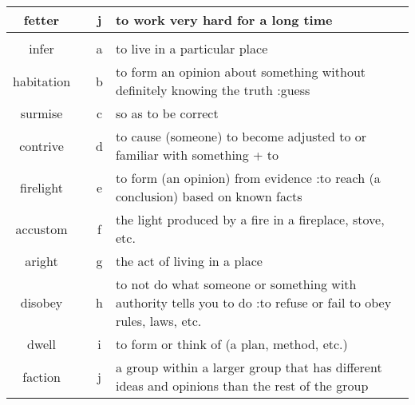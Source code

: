 \documentclass[a4paper]{article}
\begin{document}
\begin{center}
\begin{tabular}{|c|c|c|m{}|}
\hline
fetter & & j &  to work very hard for a long time \\
\hline
 & & & \\
\hline
infer & & a &  to live in a particular place \\
\hline
habitation & & b &  to form an opinion about something without definitely knowing the truth :guess \\
\hline
surmise & & c &  so as to be correct \\
\hline
contrive & & d &  to cause (someone) to become adjusted to or familiar with something + to \\
\hline
firelight & & e &  to form (an opinion) from evidence :to reach (a conclusion) based on known facts \\
\hline
accustom & & f &  the light produced by a fire in a fireplace, stove, etc. \\
\hline
aright & & g &  the act of living in a place \\
\hline
disobey & & h &  to not do what someone or something with authority tells you to do :to refuse or fail to obey rules, laws, etc. \\
\hline
dwell & & i &  to form or think of (a plan, method, etc.) \\
\hline
faction & & j &  a group within a larger group that has different ideas and opinions than the rest of the group \\
\hline
\end{tabular}
\end{center}
\end{document}
